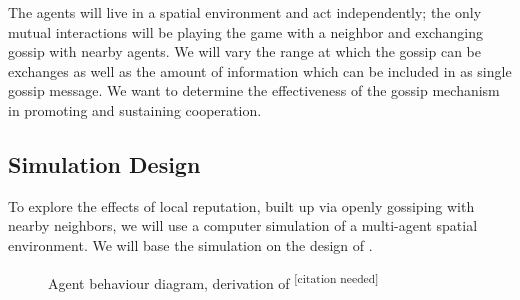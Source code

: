 \documentclass[english]{article}
\newcommand{\citationneeded}{\textsuperscript{\color{blue} [citation needed]}}
\begin{document}
The agents will live in a spatial environment and act independently;
the only mutual interactions will be playing the game with a neighbor and exchanging gossip with nearby agents.
We will vary the range at which the gossip can be exchanges as well as the amount of information which can be included in as single gossip message.
We want to determine the effectiveness of the gossip mechanism in promoting and sustaining cooperation.

\subsection{Simulation Design}

To explore the effects of local reputation, built up via openly gossiping with nearby neighbors,
we will use a computer simulation of a multi-agent spatial environment.
We will base the simulation on the design of \citet{smaldino}.

\begin{figure}[h]
  \centering
  \caption{Agent behaviour diagram, derivation of \citationneeded}
  \label{fig:agent_behaviour}
\end{figure}
\end{document}
